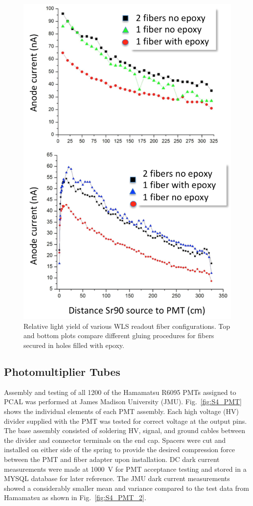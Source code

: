 \begin{figure}[hbt]
\centering
\includegraphics[width=0.85\columnwidth,keepaspectratio]{img/S4_4.png}
\caption{Relative light yield of various WLS readout fiber configurations. Top and bottom plots compare different
  gluing procedures for fibers secured in holes filled with epoxy.}
\label{fig:S4_4}
\end{figure}

\subsection{Photomultiplier Tubes}

Assembly and testing of all 1200 of the Hamamatsu R6095 PMTs assigned to PCAL was performed at James Madison University (JMU). Fig.~\ref{fig:S4_PMT} shows the individual elements of each PMT assembly.
Each high voltage (HV) divider supplied with the PMT was tested for correct voltage at the output pins. The base
assembly consisted of soldering HV, signal, and ground cables between the divider and connector terminals on the
end cap. Spacers were cut and installed on either side of the spring to provide the desired compression force
between the PMT and fiber adapter upon installation. DC dark current measurements were made at 1000~V for
PMT acceptance testing and stored in a MYSQL database for later reference. The JMU dark current
measurements showed a considerably smaller mean and variance compared to the test data from Hamamatsu as
shown in Fig.~\ref{fig:S4_PMT_2}. 

